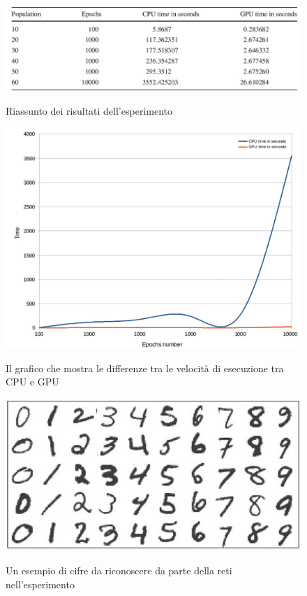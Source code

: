 \vspace{15mm}

\begin{figure}[h]
\centering
{\includegraphics[scale=0.65]{media_tesi/table_experiment.png}}
\caption{Riassunto dei risultati dell'esperimento \cite{brito2016gpu}}
\label{fig:subfig}
\end{figure}

\begin{figure}[h]
\centering
{\includegraphics[scale=0.5]{media_tesi/graph_GPU_vs_CPU.png}}
\caption{Il grafico che mostra le differenze tra le velocità di esecuzione tra CPU e GPU \cite{brito2016gpu}}
\label{fig:subfig}
\end{figure}

\begin{figure}[b]
\centering
{\includegraphics[scale=0.5]{media_tesi/MNIST.png}}
\caption{Un esempio di cifre da riconoscere da parte della reti nell'esperimento}
\label{fig:subfig}
\end{figure}

